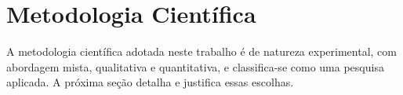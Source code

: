 \section{Metodologia Científica}

A metodologia científica adotada neste trabalho é de natureza experimental, com
abordagem mista, qualitativa e quantitativa, e classifica-se como uma pesquisa
aplicada. A próxima seção detalha e justifica essas escolhas.




